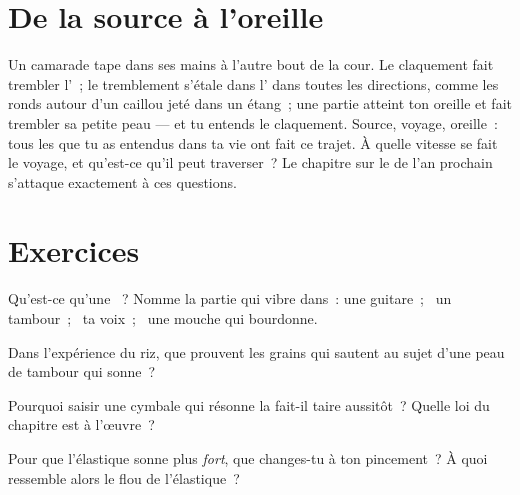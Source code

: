 \section{De la source à l'oreille}

\begin{example}\label{ex:g3:sound-around-us:journey}
Un camarade tape dans ses mains à l'autre bout de la cour. Le claquement
fait trembler l'~; le tremblement s'étale dans l' dans toutes
les directions, comme les ronds autour d'un caillou jeté dans un
étang~; une partie atteint ton oreille et fait trembler sa petite
peau --- et tu entends le claquement. Source, voyage, oreille~: tous
les  que tu as entendus dans ta vie ont fait ce trajet. À quelle
vitesse se fait le voyage, et qu'est-ce qu'il peut traverser~? Le
chapitre sur le  de l'an prochain s'attaque exactement à ces
questions.
\end{example}

\section{Exercices}

\begin{exercise}[$\star$]\label{exo:g3:sound-around-us:1}
Qu'est-ce qu'une ~? Nomme la partie qui vibre dans~: une
guitare~; \ un tambour~; \ ta voix~; \ une mouche qui bourdonne.
\end{exercise}

\begin{exercise}[$\star$]\label{exo:g3:sound-around-us:2}
Dans l'expérience du riz, que prouvent les grains qui sautent au
sujet d'une peau de tambour qui sonne~?
\end{exercise}

\begin{exercise}[$\star$]\label{exo:g3:sound-around-us:3}
Pourquoi saisir une cymbale qui résonne la fait-il taire aussitôt~?
Quelle loi du chapitre est à l'œuvre~?
\end{exercise}

\begin{exercise}[$\star$]\label{exo:g3:sound-around-us:4}
Pour que l'élastique sonne plus \emph{fort}, que changes-tu à ton
pincement~? À quoi ressemble alors le flou de l'élastique~?
\end{exercise}

